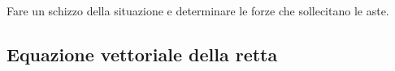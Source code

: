\begin{questions}
\begin{qblock}
{			Fare un schizzo della situazione e determinare le forze che sollecitano le aste.


		}

	\end{qblock}
\end{questions}

\subsection{Equazione vettoriale della retta}

